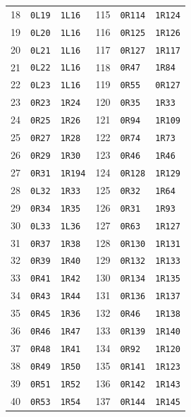 \begin{longtable}{@{}rll@{\hspace{2em}}rll@{}}
18 & \texttt{0L19} & \texttt{1L16} & 115 & \texttt{0R114} & \texttt{1R124}\\
19 & \texttt{0L20} & \texttt{1L16} & 116 & \texttt{0R125} & \texttt{1R126}\\
20 & \texttt{0L21} & \texttt{1L16} & 117 & \texttt{0R127} & \texttt{1R117}\\
21 & \texttt{0L22} & \texttt{1L16} & 118 & \texttt{0R47} & \texttt{1R84}\\
22 & \texttt{0L23} & \texttt{1L16} & 119 & \texttt{0R55} & \texttt{0R127}\\
23 & \texttt{0R23} & \texttt{1R24} & 120 & \texttt{0R35} & \texttt{1R33}\\
24 & \texttt{0R25} & \texttt{1R26} & 121 & \texttt{0R94} & \texttt{1R109}\\
25 & \texttt{0R27} & \texttt{1R28} & 122 & \texttt{0R74} & \texttt{1R73}\\
26 & \texttt{0R29} & \texttt{1R30} & 123 & \texttt{0R46} & \texttt{1R46}\\
27 & \texttt{0R31} & \texttt{1R194} & 124 & \texttt{0R128} & \texttt{1R129}\\
28 & \texttt{0L32} & \texttt{1R33} & 125 & \texttt{0R32} & \texttt{1R64}\\
29 & \texttt{0R34} & \texttt{1R35} & 126 & \texttt{0R31} & \texttt{1R93}\\
30 & \texttt{0L33} & \texttt{1L36} & 127 & \texttt{0R63} & \texttt{1R127}\\
31 & \texttt{0R37} & \texttt{1R38} & 128 & \texttt{0R130} & \texttt{1R131}\\
32 & \texttt{0R39} & \texttt{1R40} & 129 & \texttt{0R132} & \texttt{1R133}\\
33 & \texttt{0R41} & \texttt{1R42} & 130 & \texttt{0R134} & \texttt{1R135}\\
34 & \texttt{0R43} & \texttt{1R44} & 131 & \texttt{0R136} & \texttt{1R137}\\
35 & \texttt{0R45} & \texttt{1R36} & 132 & \texttt{0R46} & \texttt{1R138}\\
36 & \texttt{0R46} & \texttt{1R47} & 133 & \texttt{0R139} & \texttt{1R140}\\
37 & \texttt{0R48} & \texttt{1R41} & 134 & \texttt{0R92} & \texttt{1R120}\\
38 & \texttt{0R49} & \texttt{1R50} & 135 & \texttt{0R141} & \texttt{1R123}\\
39 & \texttt{0R51} & \texttt{1R52} & 136 & \texttt{0R142} & \texttt{1R143}\\
40 & \texttt{0R53} & \texttt{1R54} & 137 & \texttt{0R144} & \texttt{1R145}\\

\end{longtable}

